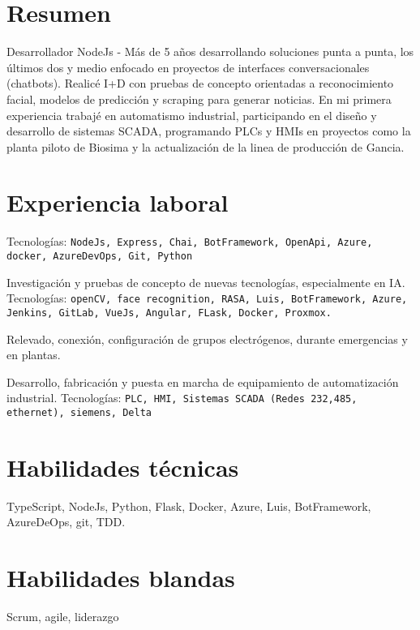 \documentclass[11pt,a4paper,sans]{moderncv}
\begin{document}
\maketitle
\section{Resumen}
Desarrollador NodeJs - Más de 5 años desarrollando soluciones punta a punta, los últimos dos y
medio enfocado en proyectos de interfaces conversacionales (chatbots). Realicé I+D con pruebas de concepto orientadas a reconocimiento facial, modelos de predicción y scraping
para generar noticias. En mi primera experiencia trabajé en automatismo industrial, participando en el diseño y desarrollo de sistemas SCADA, programando PLCs y HMIs en proyectos como la planta piloto de Biosima y la actualización de la linea de producción de Gancia.

\section{Experiencia laboral}
{Tecnolog\'ias: \texttt{NodeJs, Express, Chai, BotFramework, OpenApi, Azure, docker, AzureDevOps, Git, Python}}

{ Investigación y pruebas de concepto de nuevas tecnologías, especialmente en IA. Tecnolog\'ias: \texttt{openCV, face recognition, RASA, Luis, BotFramework, Azure, Jenkins, GitLab, VueJs, Angular, FLask, Docker, Proxmox.}}

{Relevado, conexión, configuración de grupos electrógenos, durante emergencias y en plantas.}

{ Desarrollo, fabricación y puesta en marcha de equipamiento de automatización industrial. Tecnolog\'ias: \texttt{PLC, HMI, Sistemas SCADA (Redes 232,485, ethernet), siemens, Delta}}


\section{Habilidades técnicas}
TypeScript, NodeJs, Python, Flask, Docker, Azure, Luis, BotFramework, AzureDeOps, git, TDD.

\section{Habilidades blandas}
Scrum, agile, liderazgo
\end{document}
